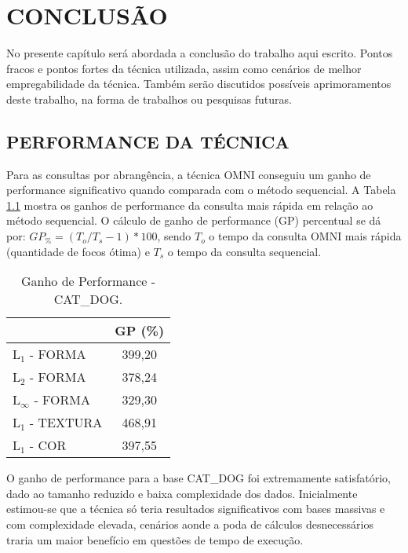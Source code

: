 
\chapter{CONCLUSÃO}
\label{chap:conclusao}
No presente capítulo será abordada a conclusão do trabalho aqui escrito. Pontos fracos e pontos fortes da técnica utilizada, assim como cenários de melhor empregabilidade da técnica. Também serão discutidos possíveis aprimoramentos deste trabalho, na forma de
trabalhos ou pesquisas futuras.

\section{PERFORMANCE DA TÉCNICA}

Para as consultas por abrangência, a técnica OMNI conseguiu um ganho de performance significativo quando comparada com o método sequencial. A Tabela \ref{tab:performance1} mostra os ganhos de performance da consulta mais rápida em relação ao método
sequencial. O cálculo de ganho de performance (GP) percentual se dá por: $GP_\% = (T_o/T_s - 1)*100$, sendo $T_o$ o tempo da consulta OMNI mais rápida (quantidade de focos ótima) e $T_s$ o tempo da consulta sequencial.

\begin{table}[H]
    \centering
    \caption[Ganho de Performance - CAT\_DOG]{Ganho de Performance - CAT\_DOG.
    \label{tab:performance1}}
   \begin{tabular}{l c}
        \toprule
            &GP (\%)\\
        \midrule
            L$_1$ - FORMA & 399,20 \\
            L$_2$ - FORMA & 378,24 \\
            L$_\infty$ - FORMA & 329,30 \\
            L$_1$ - TEXTURA & 468,91 \\
            L$_1$ - COR & 397,55 \\
        \bottomrule
    \end{tabular}
\end{table}

O ganho de performance para a base CAT\_DOG foi extremamente satisfatório, dado ao tamanho reduzido e baixa complexidade dos dados. Inicialmente estimou-se que a técnica só teria resultados significativos com bases massivas e com complexidade elevada, cenários
aonde a poda de cálculos desnecessários traria um maior benefício em questões de tempo de execução.

